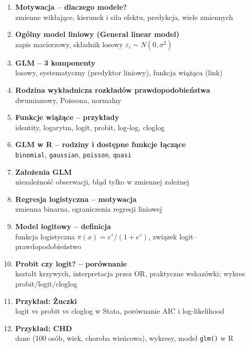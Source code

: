 \documentclass[a4paper,11pt]{article}
\begin{document}
\vspace{0.4em}
\begin{enumerate}[label=\textbf{\arabic*.}, leftmargin=1.8em, itemsep=3pt, topsep=2pt]
  \item \textbf{Motywacja -- dlaczego modele?}\\
        {\small\color{medgray}zmienne wikłające, kierunek i siła efektu, predykcja, wiele zmiennych}
  \item \textbf{Ogólny model liniowy (General linear model)}\\
        {\small\color{medgray}zapis macierzowy, składnik losowy $\varepsilon_i \sim N(0,\sigma^2)$}
  \item \textbf{GLM -- 3 komponenty}\\
        {\small\color{medgray}losowy, systematyczny (predyktor liniowy), funkcja wiążąca (link)}
  \item \textbf{Rodzina wykładnicza rozkładów prawdopodobieństwa}\\
        {\small\color{medgray}dwumianowy, Poissona, normalny}
  \item \textbf{Funkcje wiążące -- przykłady}\\
        {\small\color{medgray}identity, logarytm, logit, probit, log-log, cloglog}
  \item \textbf{GLM w R -- rodziny i dostępne funkcje łączące}\\
        {\small\color{medgray}\texttt{binomial}, \texttt{gaussian}, \texttt{poisson}, \texttt{quasi}}
  \item \textbf{Założenia GLM}\\
        {\small\color{medgray}niezależność obserwacji, błąd tylko w zmiennej zależnej}
  \item \textbf{Regresja logistyczna -- motywacja}\\
        {\small\color{medgray}zmienna binarna, ograniczenia regresji liniowej}
  \item \textbf{Model logitowy -- definicja}\\
        {\small\color{medgray}funkcja logistyczna $\pi(x) = e^z/(1+e^z)$, związek logit--prawdopodobieństwo}
  \item \textbf{Probit czy logit? -- porównanie}\\
        {\small\color{medgray}kształt krzywych, interpretacja przez OR, praktyczne wskazówki; wykres probit/logit/cloglog}
  \item \textbf{Przykład: Żuczki}\\
        {\small\color{medgray}logit vs probit vs cloglog w Stata, porównanie AIC i log-likelihood}
  \item \textbf{Przykład: CHD}\\
        {\small\color{medgray}dane (100 osób, wiek, choroba wieńcowa), wykresy, model \texttt{glm()} w R}
\end{enumerate}
 
\end{document}
